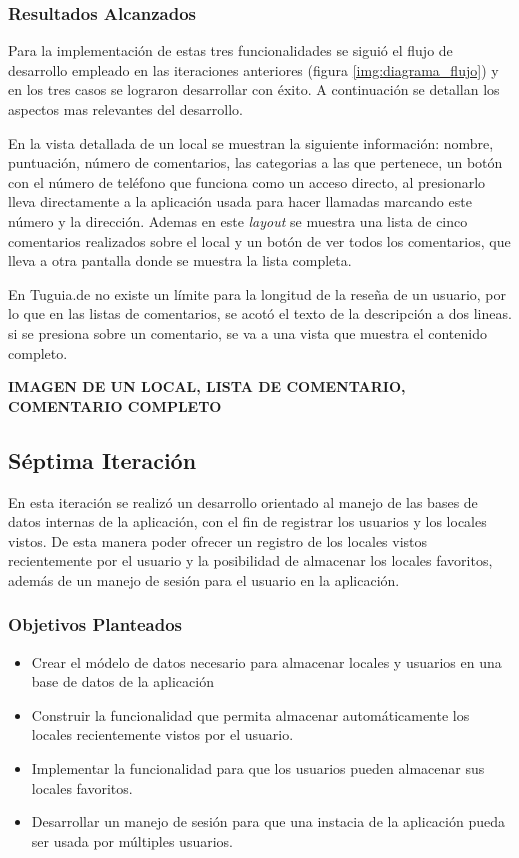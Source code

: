 \subsubsection{Resultados Alcanzados}

Para la implementación de estas tres funcionalidades se siguió el flujo de desarrollo empleado en las iteraciones anteriores (figura \ref{img:diagrama_flujo}) y en los tres casos se lograron desarrollar con éxito. A continuación se detallan los aspectos mas relevantes del desarrollo.

En la vista detallada de un local se muestran la siguiente información: nombre, puntuación, número de comentarios, las categorias a las que pertenece, un botón con el número de teléfono que funciona como un acceso directo, al presionarlo lleva directamente a la aplicación usada para hacer llamadas marcando este número y la dirección. Ademas en este \textit{layout} se muestra una lista de cinco comentarios realizados sobre el local y un botón de ver todos los comentarios, que lleva a otra pantalla donde se muestra la lista completa.

En Tuguia.de no existe un límite para la longitud de la reseña de un usuario, por lo que en las listas de comentarios, se acotó el texto de la descripción a dos lineas. si se presiona sobre un comentario, se va a una vista que muestra el contenido completo.

\textbf{IMAGEN DE UN LOCAL, LISTA DE COMENTARIO, COMENTARIO COMPLETO}
\subsection{Séptima Iteración}

En esta iteración se realizó un desarrollo orientado al manejo de las bases de datos internas de la aplicación, con el fin de registrar los usuarios y los locales vistos. De esta manera poder ofrecer un registro de los locales vistos recientemente por el usuario y la posibilidad de almacenar los locales favoritos, además de un manejo de sesión para el usuario en la aplicación.

\subsubsection{Objetivos Planteados} 

\begin{itemize}
\item Crear el módelo de datos necesario para almacenar locales y usuarios en una base de datos de la aplicación
\item Construir la funcionalidad que permita almacenar automáticamente los locales recientemente vistos por el usuario.
\item Implementar la funcionalidad para que los usuarios pueden almacenar sus locales favoritos.
\item Desarrollar un manejo de sesión para que una instacia de la aplicación pueda ser usada por múltiples usuarios. 
\end{itemize}

